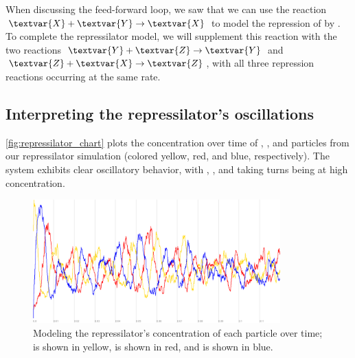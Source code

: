 When discussing the feed-forward loop, we saw that we can use the reaction $\textvar{X} + \textvar{Y} \rightarrow \textvar{X}$ to model the repression of  by . To complete the repressilator model, we will supplement this reaction with the two reactions $\textvar{Y} + \textvar{Z} \rightarrow \textvar{Y}$ and $\textvar{Z} + \textvar{X} \rightarrow \textvar{Z}$, with all three repression reactions occurring at the same rate.\\

\begin{note}\end{note}

\FloatBarrier
{}
\subsection{Interpreting the repressilator's oscillations}

\autoref{fig:repressilator_chart} plots the concentration over time of , , and  particles from our repressilator simulation (colored yellow, red, and blue, respectively). The system exhibits clear oscillatory behavior, with , , and  taking turns being at high concentration.\\

\begin{qbox}\end{qbox}

\begin{figure}[h]
\centering
\mySfFamily
\includegraphics[width = 0.85\textwidth]{../images/cellblender_repressilator_white.png}
\caption{Modeling the repressilator's concentration of each particle over time;  is shown in yellow,  is shown in red, and  is shown in blue.}
\label{fig:repressilator_chart}
\end{figure}

